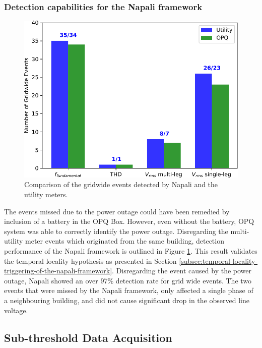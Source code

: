 \subsubsection{Detection capabilities for the Napali framework}
\begin{figure}[!ht]
    \centering
    \includegraphics[width=0.9\linewidth]{img/napali_eval/gt/money_plot1.pdf}
    \caption{Comparison of the gridwide events detected by Napali and the utility meters.}
    \label{expdes:fig:gt_money}
\end{figure}

The events missed due to the power outage could have been remedied by inclusion of a battery in the OPQ Box.
However, even without the battery, OPQ system was able to correctly identify the power outage.
Disregarding the multi-utility meter events which originated from the same building, detection performance of the Napali framework is outlined in Figure \ref{expdes:fig:gt_money}.
This result validates the temporal locality hypothesis as presented in Section \ref{subsec:temporal-locality-triggering-of-the-napali-framework}.
Disregarding the event caused by the power outage, Napali showed an over 97\% detection rate for grid wide events.
The two events that were missed by the Napali framework, only affected a single phase of a neighbouring building, and did not cause significant drop in the observed line voltage.

\subsection{Sub-threshold Data Acquisition}\label{subsec:sub-threshold-data-acquisition}

